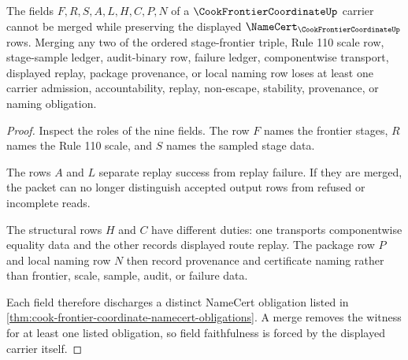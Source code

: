 \begin{theorem}
\label{thm:cook-frontier-coordinate-field-faithfulness}
The fields $F,R,S,A,L,H,C,P,N$ of a $\CookFrontierCoordinateUp$ carrier cannot be merged while preserving the displayed $\NameCert_{\CookFrontierCoordinateUp}$ rows. Merging any two of the ordered stage-frontier triple, Rule 110 scale row, stage-sample ledger, audit-binary row, failure ledger, componentwise transport, displayed replay, package provenance, or local naming row loses at least one carrier admission, accountability, replay, non-escape, stability, provenance, or naming obligation.
\end{theorem}
\begin{proof}
Inspect the roles of the nine fields. The row $F$ names the frontier stages, $R$ names the Rule 110 scale, and $S$ names the sampled stage data.

The rows $A$ and $L$ separate replay success from replay failure. If they are merged, the packet can no longer distinguish accepted output rows from refused or incomplete reads.

The structural rows $H$ and $C$ have different duties: one transports componentwise equality data and the other records displayed route replay. The package row $P$ and local naming row $N$ then record provenance and certificate naming rather than frontier, scale, sample, audit, or failure data.

Each field therefore discharges a distinct NameCert obligation listed in \autoref{thm:cook-frontier-coordinate-namecert-obligations}. A merge removes the witness for at least one listed obligation, so field faithfulness is forced by the displayed carrier itself.
\end{proof}

